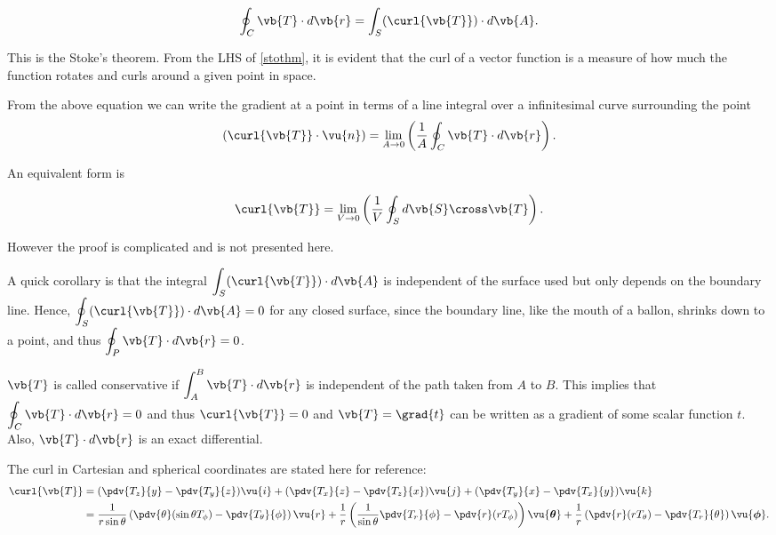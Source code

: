\documentclass[english,a4paper,12pt]{report}
\begin{document}
\begin{equation} 
	\oint_{C} \vb{T} \cdot d\vb{r} = \int_{S} (\curl{\vb{T}}) \cdot d\vb{A}. \label{stothm} 
\end{equation}
	
This is the Stoke's theorem. From the LHS of \cref{stothm}, it is evident that the curl of a vector function is a measure of how much the function rotates and curls around a given point in space.
	
From the above equation we can write the gradient at a point in terms of a line integral over a infinitesimal curve surrounding the point
\begin{equation}
	(\curl{\vb{T} } \cdot \vu{n} ) = \lim_{A \to 0} \left( \frac{1}{A} \oint_{C} \vb{T} \cdot d\vb{r}  \right). 
\end{equation}

An equivalent form is 

\begin{equation}
	\curl{\vb{T} } = \lim_{V \to 0} \left( \frac{1}{V} \oint_{S} d\vb{S} \cross \vb{T}  \right).
\end{equation}

However the proof is complicated and is not presented here.


A quick corollary is that the integral \(\displaystyle \int_{S} (\curl{\vb{T}}) \cdot d\vb{A}\) is independent of the surface used but only depends on the boundary line. Hence, \(\displaystyle \oint_{S} (\curl{\vb{T}}) \cdot d\vb{A} = 0\) for any closed surface, since the boundary line, like the mouth of a ballon, shrinks down to a point, and thus \(\displaystyle \oint_{P} \vb{T} \cdot d\vb{r} = 0\).

\(\vb{T} \) is called conservative if \(\displaystyle \int_{A}^{B}  \vb{T} \cdot d\vb{r}  \) is independent of the path taken from \(A\) to \(B\). This implies that \(\displaystyle \oint_{C} \vb{T} \cdot d\vb{r} = 0\) and thus \(\curl{\vb{T} } = 0\) and \(\vb{T} = \grad{t} \) can be written as a gradient of some scalar function \(t\). Also, \(\vb{T} \cdot d\vb{r} \) is an exact differential.      

The curl in Cartesian and spherical coordinates are stated here for reference:
\begin{equation} 
	\begin{aligned}
	\curl{\vb{T}} &= (\pdv{T_z}{y} - \pdv{T_y}{z})\vu{i} + (\pdv{T_x}{z} - \pdv{T_z}{x})\vu{j} + (\pdv{T_y}{x} - \pdv{T_x}{y})\vu{k} \\ &= \frac{1}{r\sin{\theta}}\left(\pdv{\theta}(\sin{\theta}T_{\phi}) - \pdv{T_{\theta}}{\phi}\right)\vu{r} + \frac{1}{r}\left(\frac{1}{\sin{\theta}}\pdv{T_r}{\phi} - \pdv{r}(rT_{\phi})\right)\vu{\boldsymbol{\theta } } + \frac{1}{r}\left(\pdv{r}(rT_{\theta}) - \pdv{T_r}{\theta}\right)\vu{\boldsymbol{\phi } }. 
    \end{aligned}
\end{equation}
	
\end{document}
